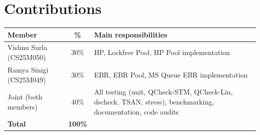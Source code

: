 \documentclass[11pt,a4paper]{article}
\begin{document}
\section*{Contributions}
\label{sec:contributions}

\begin{center}
\begin{tabular}{@{}lcp{5.5cm}@{}}
\toprule
\textbf{Member} & \textbf{\%} & \textbf{Main responsibilities} \\
\midrule
Vishnu Surla (CS25M050) & 30\% & HP, Lockfree Pool, HP Pool implementation \\
Ramya Sinigi (CS25M049) & 30\% & EBR, EBR Pool, MS Queue EBR implementation \\
Joint (both members) & 40\% & All testing (unit, QCheck-STM, QCheck-Lin,
  dscheck, TSAN, stress), benchmarking, documentation, code audits \\
\midrule
\textbf{Total} & \textbf{100\%} & \\
\bottomrule
\end{tabular}
\end{center}



\end{document}
